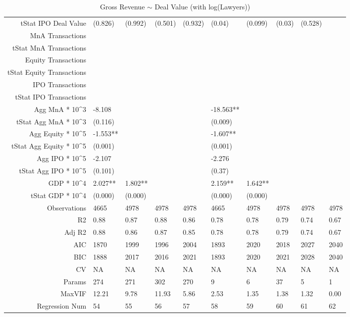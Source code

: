 \begin{table}[ht]
\begin{tabular}{rlllllllll}
  tStat IPO Deal Value & (0.826) & (0.992) & (0.501) & (0.932) & (0.04) & (0.099) & (0.03) & (0.528) &  \\ 
  MnA Transactions &  &  &  &  &  &  &  &  &  \\ 
  tStat MnA Transactions &  &  &  &  &  &  &  &  &  \\ 
  Equity Transactions &  &  &  &  &  &  &  &  &  \\ 
  tStat Equity Transactions &  &  &  &  &  &  &  &  &  \\ 
  IPO Transactions &  &  &  &  &  &  &  &  &  \\ 
  tStat IPO Transactions &  &  &  &  &  &  &  &  &  \\ 
  Agg MnA * 10^3 & -8.108 &  &  &  & -18.563** &  &  &  &  \\ 
  tStat Agg MnA * 10^3 & (0.116) &  &  &  & (0.009) &  &  &  &  \\ 
  Agg Equity * 10^5 & -1.553** &  &  &  & -1.607** &  &  &  &  \\ 
  tStat Agg Equity * 10^5 & (0.001) &  &  &  & (0.001) &  &  &  &  \\ 
  Agg IPO * 10^5 & -2.107 &  &  &  & -2.276 &  &  &  &  \\ 
  tStat Agg IPO * 10^5 & (0.101) &  &  &  & (0.37) &  &  &  &  \\ 
  GDP * 10^4 & 2.027** & 1.802** &  &  & 2.159** & 1.642** &  &  &  \\ 
  tStat GDP * 10^4 & (0.000) & (0.000) &  &  & (0.000) & (0.000) &  &  &  \\ 
  Observations & 4665 & 4978 & 4978 & 4978 & 4665 & 4978 & 4978 & 4978 & 4978 \\ 
  R2 & 0.88 & 0.87 & 0.88 & 0.86 & 0.78 & 0.78 & 0.79 & 0.74 & 0.67 \\ 
  Adj R2 & 0.88 & 0.86 & 0.87 & 0.85 & 0.78 & 0.78 & 0.79 & 0.74 & 0.67 \\ 
  AIC & 1870 & 1999 & 1996 & 2004 & 1893 & 2020 & 2018 & 2027 & 2040 \\ 
  BIC & 1888 & 2017 & 2016 & 2021 & 1893 & 2020 & 2021 & 2028 & 2040 \\ 
  CV & NA & NA & NA & NA & NA & NA & NA & NA & NA \\ 
  Params & 274 & 271 & 302 & 270 & 9 & 6 & 37 & 5 & 1 \\ 
  MaxVIF & 12.21 & 9.78 & 11.93 & 5.86 & 2.53 & 1.35 & 1.38 & 1.32 & 0.00 \\ 
  Regression Num & 54 & 55 & 56 & 57 & 58 & 59 & 60 & 61 & 62 \\ 
   \hline
\end{tabular}
\caption{Gross Revenue $\sim$ Deal Value (with log(Lawyers))} 
\end{table}
